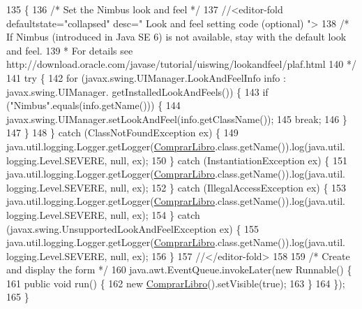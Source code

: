 \begin{DoxyCode}
135                                            \{
136         \textcolor{comment}{/* Set the Nimbus look and feel */}
137         \textcolor{comment}{//<editor-fold defaultstate="collapsed" desc=" Look and feel setting code (optional) ">}
138         \textcolor{comment}{/* If Nimbus (introduced in Java SE 6) is not available, stay with the default look and feel.}
139 \textcolor{comment}{         * For details see http://download.oracle.com/javase/tutorial/uiswing/lookandfeel/plaf.html }
140 \textcolor{comment}{         */}
141         \textcolor{keywordflow}{try} \{
142             \textcolor{keywordflow}{for} (javax.swing.UIManager.LookAndFeelInfo info : javax.swing.UIManager.
      getInstalledLookAndFeels()) \{
143                 \textcolor{keywordflow}{if} (\textcolor{stringliteral}{"Nimbus"}.equals(info.getName())) \{
144                     javax.swing.UIManager.setLookAndFeel(info.getClassName());
145                     \textcolor{keywordflow}{break};
146                 \}
147             \}
148         \} \textcolor{keywordflow}{catch} (ClassNotFoundException ex) \{
149             java.util.logging.Logger.getLogger(\mbox{\hyperlink{class_interfaz_package_1_1_comprar_libro_aa2b72bc79a74662e97fd03629929e6b6}{ComprarLibro}}.class.getName()).log(java.util.
      logging.Level.SEVERE, null, ex);
150         \} \textcolor{keywordflow}{catch} (InstantiationException ex) \{
151             java.util.logging.Logger.getLogger(\mbox{\hyperlink{class_interfaz_package_1_1_comprar_libro_aa2b72bc79a74662e97fd03629929e6b6}{ComprarLibro}}.class.getName()).log(java.util.
      logging.Level.SEVERE, null, ex);
152         \} \textcolor{keywordflow}{catch} (IllegalAccessException ex) \{
153             java.util.logging.Logger.getLogger(\mbox{\hyperlink{class_interfaz_package_1_1_comprar_libro_aa2b72bc79a74662e97fd03629929e6b6}{ComprarLibro}}.class.getName()).log(java.util.
      logging.Level.SEVERE, null, ex);
154         \} \textcolor{keywordflow}{catch} (javax.swing.UnsupportedLookAndFeelException ex) \{
155             java.util.logging.Logger.getLogger(\mbox{\hyperlink{class_interfaz_package_1_1_comprar_libro_aa2b72bc79a74662e97fd03629929e6b6}{ComprarLibro}}.class.getName()).log(java.util.
      logging.Level.SEVERE, null, ex);
156         \}
157         \textcolor{comment}{//</editor-fold>}
158 
159         \textcolor{comment}{/* Create and display the form */}
160         java.awt.EventQueue.invokeLater(\textcolor{keyword}{new} Runnable() \{
161             \textcolor{keyword}{public} \textcolor{keywordtype}{void} run() \{
162                 \textcolor{keyword}{new} \mbox{\hyperlink{class_interfaz_package_1_1_comprar_libro_aa2b72bc79a74662e97fd03629929e6b6}{ComprarLibro}}().setVisible(\textcolor{keyword}{true});
163             \}
164         \});
165     \}
\end{DoxyCode}


